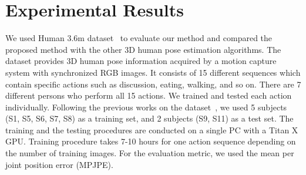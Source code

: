 \documentclass[runningheads]{llncs}
\begin{document}
\section{Experimental Results}
\label{sec:exp}
We used Human 3.6m dataset~\cite{h36m_pami} to evaluate our method and compared the proposed method with the other 3D human pose estimation algorithms. The dataset provides 3D human pose information acquired by a motion capture system with synchronized RGB images. It consists of 15 different sequences which contain specific actions such as discussion, eating, walking, and so on. There are 7 different persons who perform all 15 actions. We trained and tested each action individually. Following the previous works on the dataset~\cite{li20143d,Zhou_2016_CVPR}, we used 5 subjects (S1, S5, S6, S7, S8) as a training set, and 2 subjects (S9, S11) as a test set. The training and the testing procedures are conducted on a single PC with a Titan X GPU. Training procedure takes 7-10 hours for one action sequence depending on the number of training images. For the evaluation metric, we used the mean per joint position error (MPJPE).
\end{document}
